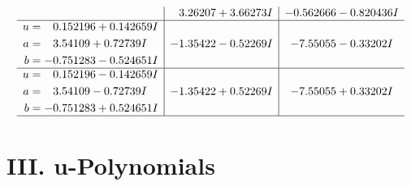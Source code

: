 \documentclass[1p]{elsarticle_modified}
\theoremstyle{definition}
\begin{document}
$$\begin{array}{c|c|c}
 & \phantom{-}3.26207 + 3.66273 I & -0.562666 - 0.820436 I \\ \hline\begin{aligned}
u &= \phantom{-}0.152196 + 0.142659 I \\
a &= \phantom{-}3.54109 + 0.72739 I \\
b &= -0.751283 - 0.524651 I\end{aligned}
 & -1.35422 - 0.52269 I & -7.55055 - 0.33202 I \\ \hline\begin{aligned}
u &= \phantom{-}0.152196 - 0.142659 I \\
a &= \phantom{-}3.54109 - 0.72739 I \\
b &= -0.751283 + 0.524651 I\end{aligned}
 & -1.35422 + 0.52269 I & -7.55055 + 0.33202 I\\
 \hline 
 \end{array}$$\newpage
\newpage\renewcommand{\arraystretch}{1}
\centering \section*{ III. u-Polynomials}
\end{document}
